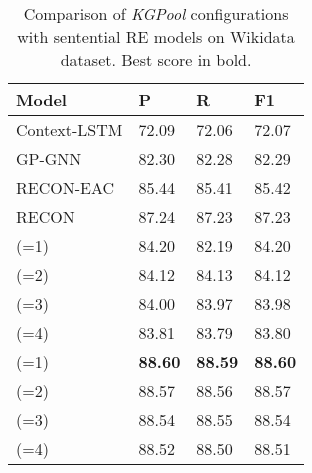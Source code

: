 \documentclass[11pt,a4paper]{article}
\begin{document}
\begin{table}[ht!]
    \centering
\begin{tabular}{p{3.5cm}|p{0.7cm}p{0.7cm}p{0.7cm}}
\toprule
\textbf{Model} &P & R & F1  \\
\midrule
    Context-LSTM & 72.09 &72.06 &72.07  \\
GP-GNN & 82.30  &82.28  &82.29 \\
      RECON-EAC  & 85.44 & 85.41 & 85.42 \\
      RECON & 87.24 & 87.23 & 87.23 \\
\midrule
   (=1) & 84.20 & 82.19 & 84.20 \\
     (=2) & 84.12 & 84.13 & 84.12 \\
      (=3) & 84.00 & 83.97 & 83.98 \\
       (=4) & 83.81 & 83.79 & 83.80 \\
\midrule
      (=1) & \textbf{88.60} & \textbf{88.59} & \textbf{88.60} \\
        (=2) & 88.57 & 88.56 & 88.57 \\
          (=3) & 88.54 & 88.55 & 88.54 \\
            (=4) & 88.52 & 88.50 & 88.51 \\
\bottomrule
 \end{tabular}
\caption{Comparison of \textit{KGPool} configurations with sentential RE models on Wikidata dataset. Best score in bold.}
\label{tab:results1}
    \vspace{-2mm}
\end{table}
\end{document}
